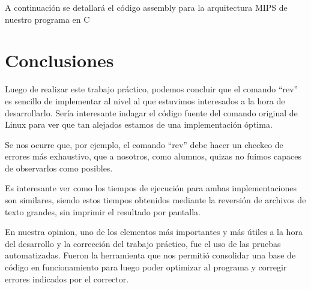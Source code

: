 \documentclass{article}
\begin{document}
A continuaci\'on se detallará el c\'odigo assembly para la arquitectura MIPS de nuestro programa en C



\section{Conclusiones}

Luego de realizar este trabajo práctico, podemos concluir que el comando ``rev'' es sencillo de implementar al nivel al que estuvimos interesados a la hora de desarrollarlo. Sería interesante indagar el c\'odigo fuente del comando original de Linux para ver que tan alejados estamos de una implementación óptima.

Se nos ocurre que, por ejemplo, el comando ``rev'' debe hacer un checkeo de errores más exhaustivo, que a nosotros, como alumnos, quizas no fuimos capaces de observarlos como posibles.

Es interesante ver como los tiempos de ejecución para ambas implementaciones son similares, siendo estos tiempos obtenidos mediante la reversión de archivos de texto grandes, sin imprimir el resultado por pantalla.

En nuestra opinion, uno de los elementos más importantes y más útiles a la hora del desarrollo y la corrección del trabajo práctico, fue el uso de las pruebas automatizadas. Fueron la herramienta que nos permitió consolidar una base de código en funcionamiento para luego poder optimizar al programa y corregir errores indicados por el corrector.
\end{document}
